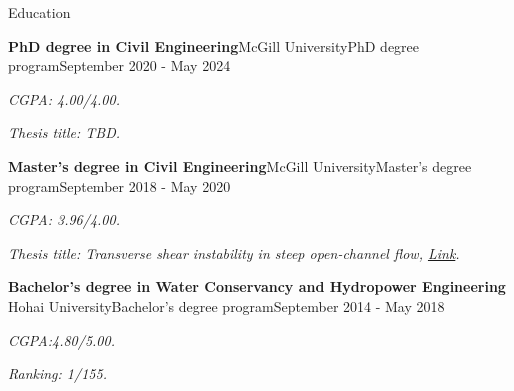 \documentclass{resume} %
\newcommand{\italicitem}[1]{\item{\textit{#1}}}
\begin{document}



\begin{rSection}{Education}
	
	\begin{rSubsectionNoBullet}{\bf PhD degree in  Civil Engineering}{McGill University}{PhD degree program}{September 2020 - May 2024}
		\italicitem{CGPA:\textit{ 4.00/4.00}.}
		\italicitem{Thesis title: TBD.}
	\end{rSubsectionNoBullet}

    \begin{rSubsectionNoBullet}{\bf Master's degree in  Civil Engineering}{McGill University}{Master's degree program}{September 2018 - May 2020}
        \italicitem{CGPA:\textit{ 3.96/4.00}.}
        \italicitem{Thesis title: \textit{Transverse shear instability in steep open-channel flow}, \href{https://escholarship.mcgill.ca/concern/theses/2n49t6525}{Link}.}
    \end{rSubsectionNoBullet}
    
    \begin{rSubsectionNoBullet}{\bf Bachelor's degree in  Water Conservancy and Hydropower Engineering}{ Hohai University}{Bachelor's degree program}{September 2014 - May 2018}
        \italicitem{CGPA:\textit{4.80/5.00}.}
        \italicitem{Ranking: 1/155.}
    \end{rSubsectionNoBullet}

\end{rSection}
\end{document}
